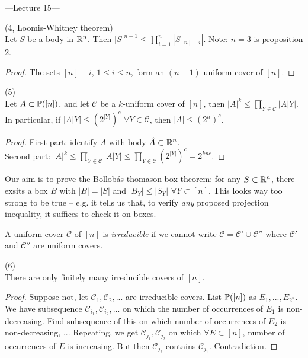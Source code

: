 \documentclass[a4paper]{article}
\begin{document}
---Lecture 15---

\begin{coro} (4, Loomis-Whitney theorem)\\
    Let $S$ be a body in $\R^n$. Then $|S|^{n-1} \leq \prod_{i=1}^n |S_{[n]-i}|$.
    Note: $n=3$ is proposition 2.
    \begin{proof}
        The sets $[n]-i$, $1 \leq i \leq n$, form an $(n-1)$-uniform cover of $[n]$.
    \end{proof}
\end{coro}

\begin{coro} (5)\\
    Let $A \subset \P([n])$, and let $\mathcal{C}$ be a $k$-uniform cover of $[n]$, then $|A|^k \leq \prod_{Y \in \mathcal{C}} |A|Y|$. In particular, if $|A|Y| \leq (2^{|Y|})^c$ $\forall Y \in \mathcal{C}$, then $|A| \leq (2^n)^c$.
    \begin{proof}
        First part: identify $A$ with body $\hat{A} \subset \R^n$.\\
        Second part: $|A|^k \leq \prod_{Y \in \mathcal{C}} |A|Y| \leq \prod_{Y \in \mathcal{C}} (2^{|Y|})^c = 2^{knc}$.
    \end{proof}
\end{coro}

Our aim is to prove the Bollob\'as-thomason box theorem: for any $S \subset \R^n$, there exsits a box $B$ with $|B| = |S|$ and $|B_Y| \leq |S_Y|$ $\forall Y \subset [n]$. This looks way too strong to be true -- e.g. it tells us that, to verify \emph{any} proposed projection inequality, it suffices to check it on boxes.

A uniform cover $\mathcal{C}$ of $[n]$ is \emph{irreducible} if we cannot write $\mathcal{C} = \mathcal{C}' \cup \mathcal{C}''$ where $\mathcal{C}'$ and $\mathcal{C}''$ are uniform covers.

\begin{lemma} (6)\\
    There are only finitely many irreducible covers of $[n]$.
    \begin{proof}
        Suppose not, let $\mathcal{C}_1,\mathcal{C}_2,...$ are irreducible covers. List $\P([n])$ as $E_1,...,E_{2^n}$. We have subsequence $\mathcal{C}_{i_1},\mathcal{C}_{i_2},...$ on which the number of occurrences of $E_1$ is non-decreasing. Find subsequence of this on which number of occurrences of $E_2$ is non-decreasing, ... Repeating, we get $\mathcal{C}_{j_1},\mathcal{C}_{j_2}$ on which $\forall E \subset [n]$, number of occurrences of $E$ is increasing. But then $\mathcal{C}_{j_2}$ contains $\mathcal{C}_{j_1}$. Contradiction.
    \end{proof}
\end{lemma}
\end{document}
